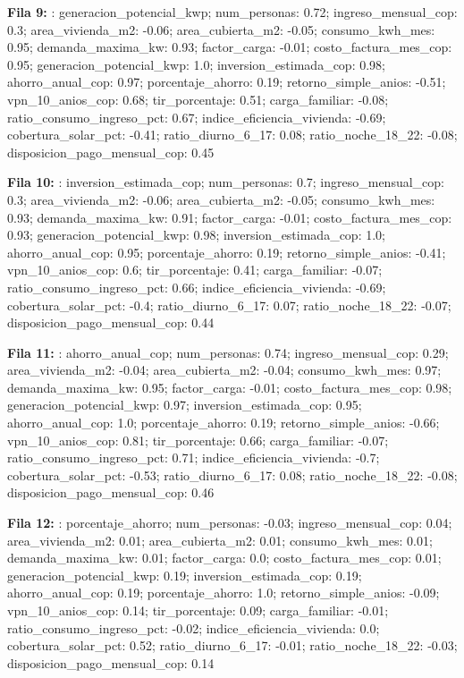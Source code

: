 {\footnotesize\textbf{Fila 9:} : generacion\_potencial\_kwp; num\_personas: 0.72; ingreso\_mensual\_cop: 0.3; area\_vivienda\_m2: -0.06; area\_cubierta\_m2: -0.05; consumo\_kwh\_mes: 0.95; demanda\_maxima\_kw: 0.93; factor\_carga: -0.01; costo\_factura\_mes\_cop: 0.95; generacion\_potencial\_kwp: 1.0; inversion\_estimada\_cop: 0.98; ahorro\_anual\_cop: 0.97; porcentaje\_ahorro: 0.19; retorno\_simple\_anios: -0.51; vpn\_10\_anios\_cop: 0.68; tir\_porcentaje: 0.51; carga\_familiar: -0.08; ratio\_consumo\_ingreso\_pct: 0.67; indice\_eficiencia\_vivienda: -0.69; cobertura\_solar\_pct: -0.41; ratio\_diurno\_6\_17: 0.08; ratio\_noche\_18\_22: -0.08; disposicion\_pago\_mensual\_cop: 0.45\par}
{\footnotesize\textbf{Fila 10:} : inversion\_estimada\_cop; num\_personas: 0.7; ingreso\_mensual\_cop: 0.3; area\_vivienda\_m2: -0.06; area\_cubierta\_m2: -0.05; consumo\_kwh\_mes: 0.93; demanda\_maxima\_kw: 0.91; factor\_carga: -0.01; costo\_factura\_mes\_cop: 0.93; generacion\_potencial\_kwp: 0.98; inversion\_estimada\_cop: 1.0; ahorro\_anual\_cop: 0.95; porcentaje\_ahorro: 0.19; retorno\_simple\_anios: -0.41; vpn\_10\_anios\_cop: 0.6; tir\_porcentaje: 0.41; carga\_familiar: -0.07; ratio\_consumo\_ingreso\_pct: 0.66; indice\_eficiencia\_vivienda: -0.69; cobertura\_solar\_pct: -0.4; ratio\_diurno\_6\_17: 0.07; ratio\_noche\_18\_22: -0.07; disposicion\_pago\_mensual\_cop: 0.44\par}
{\footnotesize\textbf{Fila 11:} : ahorro\_anual\_cop; num\_personas: 0.74; ingreso\_mensual\_cop: 0.29; area\_vivienda\_m2: -0.04; area\_cubierta\_m2: -0.04; consumo\_kwh\_mes: 0.97; demanda\_maxima\_kw: 0.95; factor\_carga: -0.01; costo\_factura\_mes\_cop: 0.98; generacion\_potencial\_kwp: 0.97; inversion\_estimada\_cop: 0.95; ahorro\_anual\_cop: 1.0; porcentaje\_ahorro: 0.19; retorno\_simple\_anios: -0.66; vpn\_10\_anios\_cop: 0.81; tir\_porcentaje: 0.66; carga\_familiar: -0.07; ratio\_consumo\_ingreso\_pct: 0.71; indice\_eficiencia\_vivienda: -0.7; cobertura\_solar\_pct: -0.53; ratio\_diurno\_6\_17: 0.08; ratio\_noche\_18\_22: -0.08; disposicion\_pago\_mensual\_cop: 0.46\par}
{\footnotesize\textbf{Fila 12:} : porcentaje\_ahorro; num\_personas: -0.03; ingreso\_mensual\_cop: 0.04; area\_vivienda\_m2: 0.01; area\_cubierta\_m2: 0.01; consumo\_kwh\_mes: 0.01; demanda\_maxima\_kw: 0.01; factor\_carga: 0.0; costo\_factura\_mes\_cop: 0.01; generacion\_potencial\_kwp: 0.19; inversion\_estimada\_cop: 0.19; ahorro\_anual\_cop: 0.19; porcentaje\_ahorro: 1.0; retorno\_simple\_anios: -0.09; vpn\_10\_anios\_cop: 0.14; tir\_porcentaje: 0.09; carga\_familiar: -0.01; ratio\_consumo\_ingreso\_pct: -0.02; indice\_eficiencia\_vivienda: 0.0; cobertura\_solar\_pct: 0.52; ratio\_diurno\_6\_17: -0.01; ratio\_noche\_18\_22: -0.03; disposicion\_pago\_mensual\_cop: 0.14\par}
